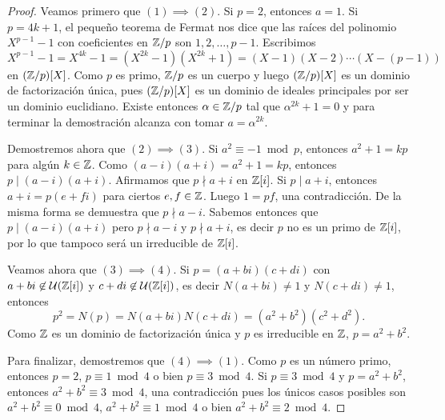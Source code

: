 \begin{proof}
Veamos primero que $(1)\implies (2)$. Si $p=2$, entonces $a=1$. Si $p=4k+1$, el pequeño teorema de Fermat nos dice que 
las raíces del polinomio $X^{p-1}-1$ 
con coeficientes en $\mathbb{Z}/p$ son $1,2,\dots,p-1$. Escribimos
\[
X^{p-1}-1=X^{4k}-1=(X^{2k}-1)(X^{2k}+1)=(X-1)(X-2)\cdots (X-(p-1))
\]
en $(\mathbb{Z}/p)[X]$. Como $p$ es primo, $\mathbb{Z}/p$ es un cuerpo y luego $(\mathbb{Z}/p)[X]$ es un dominio de factorización única, pues
$(\mathbb{Z}/p)[X]$ es un dominio de ideales principales por ser un dominio euclidiano. Existe entonces $\alpha\in\mathbb{Z}/p$
tal que $\alpha^{2k}+1=0$ y para terminar la demostración alcanza con tomar $a=\alpha^{2k}$. 

Demostremos ahora que $(2)\implies(3)$. Si $a^2\equiv -1\bmod p$, entonces $a^2+1=kp$ para algún $k\in\mathbb{Z}$. Como
$(a-i)(a+i)=a^2+1=kp$, entonces $p\mid (a-i)(a+i)$. Afirmamos que $p\nmid a+i$ en $\mathbb{Z}[i]$. Si $p\mid a+i$, entonces
$a+i=p(e+fi)$ para ciertos $e,f\in\mathbb{Z}$. Luego $1=pf$, una contradicción. De la misma forma se demuestra que $p\nmid a-i$. 
Sabemos entonces que $p\mid (a-i)(a+i)$ pero $p\nmid a-i$ y $p\nmid a+i$, es decir $p$ no es un primo de $\mathbb{Z}[i]$, por lo que 
tampoco será un irreducible de $\mathbb{Z}[i]$. 

Veamos ahora que $(3)\implies(4)$. Si $p=(a+bi)(c+di)$ con $a+bi\not\in\mathcal{U}(\mathbb{Z}[i])$ y $c+di\not\in\mathcal{U}(\mathbb{Z}[i])$, 
es decir $N(a+bi)\ne 1$ y $N(c+di)\ne 1$, entonces
\[
p^2=N(p)=N(a+bi)N(c+di)=(a^2+b^2)(c^2+d^2).
\]
Como $\mathbb{Z}$ es un dominio de factorización única y $p$ es irreducible en $\mathbb{Z}$, $p=a^2+b^2$. 

Para finalizar, demostremos que $(4)\implies(1)$. Como $p$ es un número primo, entonces $p=2$, $p\equiv 1\bmod 4$ o bien $p\equiv 3\bmod 4$. Si $p\equiv 3\bmod 4$ y $p=a^2+b^2$, entonces
$a^2+b^2\equiv 3\bmod 4$, una contradicción pues los únicos casos posibles son $a^2+b^2\equiv 0\bmod 4$, $a^2+b^2\equiv 1\bmod 4$ o bien $a^2+b^2\equiv 2\bmod 4$.     
\end{proof}

%
%
%	
	
